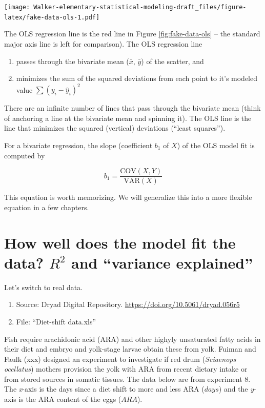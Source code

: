 \documentclass[]{book}
\providecommand{\tightlist}{%
  \setlength{\itemsep}{0pt}\setlength{\parskip}{0pt}}
\theoremstyle{definition}
\theoremstyle{definition}
\theoremstyle{definition}
\theoremstyle{remark}
\begin{document}
\texttt{[image: Walker-elementary-statistical-modeling-draft\_files/figure-latex/fake-data-ols-1.pdf]}

The OLS regression line is the red line in Figure
\ref{fig:fake-data-ols} -- the standard major axis line is left for
comparison). The OLS regression line

\begin{enumerate}
\def\labelenumi{\arabic{enumi}.}
\tightlist
\item
  passes through the bivariate mean (\(\bar{x}\), \(\bar{y}\)) of the
  scatter, and
\item
  minimizes the sum of the squared deviations from each point to it's
  modeled value \(\sum{(y_i - \hat{y}_i)^2}\)
\end{enumerate}

There are an infinite number of lines that pass through the bivariate
mean (think of anchoring a line at the bivariate mean and spinning it).
The OLS line is the line that minimizes the squared (vertical)
deviations (``least squares'').

For a bivariate regression, the slope (coefficient \(b_1\) of \(X\)) of
the OLS model fit is computed by

\begin{equation}
b_1 = \frac{\mathrm{COV}(X, Y)}{\mathrm{VAR}(X)}
\end{equation}

This equation is worth memorizing. We will generalize this into a more
flexible equation in a few chapters.

\section{\texorpdfstring{How well does the model fit the data? \(R^2\)
and ``variance
explained''}{How well does the model fit the data? R\^{}2 and variance explained}}\label{how-well-does-the-model-fit-the-data-r2-and-variance-explained}

Let's switch to real data.

\begin{enumerate}
\def\labelenumi{\arabic{enumi}.}
\tightlist
\item
  Source: Dryad Digital Repository.
  \url{https://doi.org/10.5061/dryad.056r5}
\item
  File: ``Diet-shift data.xls''
\end{enumerate}

Fish require arachidonic acid (ARA) and other highyly unsaturated fatty
acids in their diet and embryo and yolk-stage larvae obtain these from
yolk. Fuiman and Faulk (xxx) designed an experiment to investigate if
red drum (\emph{Sciaenops ocellatus}) mothers provision the yolk with
ARA from recent dietary intake or from stored sources in somatic
tissues. The data below are from experiment 8. The \emph{x}-axis is the
days since a diet shift to more and less ARA (\(days\)) and the
\emph{y}-axis is the ARA content of the eggs (\(ARA\)).
\end{document}
